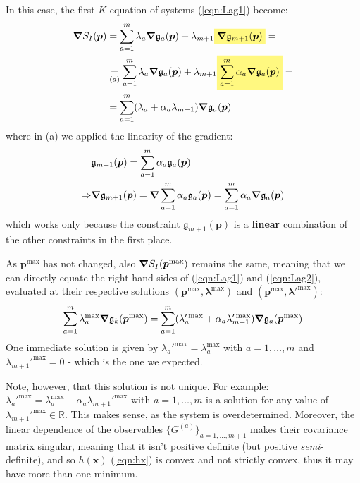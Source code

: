\documentclass[../template.tex]{subfiles}
\begin{document}
\begin{exo}
    \medskip

    In this case, the first $K$ equation of systems (\ref{eqn:Lag1}) become:
    \begin{align} \nonumber
        \grad S_I(\bm{p}) &= \sum_{a=1}^m \lambda_a \grad \mathfrak g_a(\bm{p}) + \lambda_{m+1}  \hlc{Yellow}{\grad \mathfrak{g}_{m+1}(\bm{p})} =\\ \nonumber
        &\underset{(a)}{=}  \sum_{a=1}^m \lambda_a \grad \mathfrak g_a(\bm{p}) + \lambda_{m+1} \hlc{Yellow}{\sum_{a=1}^m \alpha_a \grad \mathfrak{g}_a(\bm{p})} =\\
        &= \sum_{a=1}^m (\lambda_a + \alpha_a \lambda_{m+1}) \grad \mathfrak g_a(\bm{p}) \label{eqn:Lag2}
    \end{align}
    where in (a) we applied the linearity of the gradient:
    \begin{align*}
        &\mathfrak{g}_{m+1}(\bm{p}) = \sum_{a=1}^m \alpha_a \mathfrak{g}_a (\bm{p}) \\
        \Rightarrow 
        &\grad \mathfrak{g}_{m+1} (\bm{p}) = \grad \sum_{a=1}^m \alpha_a \mathfrak{g}_a (\bm{p}) = \sum_{a=1}^m \alpha_a \grad \mathfrak{g}_a(\bm{p}) 
    \end{align*}
    which works only because the constraint $\mathfrak{g}_{m+1}(\bm{p})$ is a \textbf{linear} combination of the other constraints in the first place.

    As $\bm{p}^{\max}$ has not changed, also $\grad S_I(\bm{p}^{\max})$ remains the same, meaning that we can directly equate the right hand sides of (\ref{eqn:Lag1}) and (\ref{eqn:Lag2}), evaluated at their respective solutions $(\bm{p}^{\max}, \bm{\lambda}^{\max})$ and $(\bm{p}^{\max}, \bm{\lambda'}^{\max})$:
    \begin{align*}
        \sum_{a=1}^m \lambda_a^{\max} \grad \mathfrak{g}_k (\bm{p}^{\max}) = \sum_{a=1}^m (\lambda_a'^{\max} + \alpha_a \lambda_{m+1}'^{\max}) \grad \mathfrak g_a(\bm{p}^{\max})
    \end{align*}
    One immediate solution is given by $\lambda_a'^{\max} = \lambda_a^{\max}$ with $a=1,\dots,m$ and $\lambda_{m+1}'^{\max} = 0$ - which is the one we expected.

    \medskip

    Note, however, that this solution is not unique. For example: $\lambda_a'^{\max} = \lambda_a^{\max} - \alpha_a \lambda_{m+1}'^{\max}$ with $a=1,\dots,m$ is a solution for any value of $\lambda_{m+1}'^{\max} \in \mathbb{R}$. This makes sense, as the system is overdetermined. Moreover, the linear dependence of the observables $\{G^{(a)}\}_{a=1,\dots,m+1}$ makes their covariance matrix singular, meaning that it isn't positive definite (but positive \textit{semi}-definite), and so $h(\bm{x})$ (\ref{eqn:hx}) is convex and not strictly convex, thus it may have more than one minimum.

\end{exo}
\end{document}
